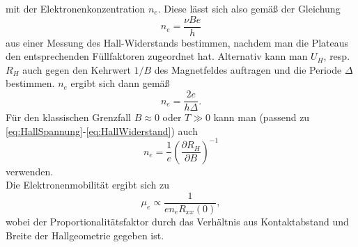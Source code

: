 mit der Elektronenkonzentration $n_e$. Diese lässt sich also gemäß der Gleichung
\begin{equation}\label{eq:ElektrKonz1}
n_e = \frac{\nu Be}{h}
\end{equation}
aus einer Messung des Hall-Widerstands bestimmen, nachdem man die Plateaus den entsprechenden Füllfaktoren zugeordnet hat.
Alternativ kann man $U_H$, resp. $R_H$ auch gegen den Kehrwert $1/B$ des Magnetfeldes auftragen und die Periode
$\Delta$ bestimmen. $n_e$ ergibt sich dann gemäß
\begin{equation}\label{eq:ElektrKonz2}
n_e = \frac{2e}{h\Delta}.
\end{equation}
Für den klassischen Grenzfall $B\approx 0$ oder $T\gg0$ kann man (passend zu \eqref{eq:HallSpannung}-\eqref{eq:HallWiderstand}) auch
\begin{equation}\label{eq:ElektrKonz3}
n_e = \frac{1}{e}\left(\frac{\partial R_H}{\partial B}\right)^{-1}
\end{equation}
verwenden.\\
Die Elektronenmobilität ergibt sich zu
\begin{equation}\label{eq:Mobilitaet}
\mu_e \propto \frac{1}{e n_eR_{xx}(0)},
\end{equation}
wobei der Proportionalitätsfaktor durch das Verhältnis aus Kontaktabstand und Breite der Hallgeometrie gegeben ist.
\nocite{qhe}
\nocite{wiki-fg}
\nocite{wiki-he}
